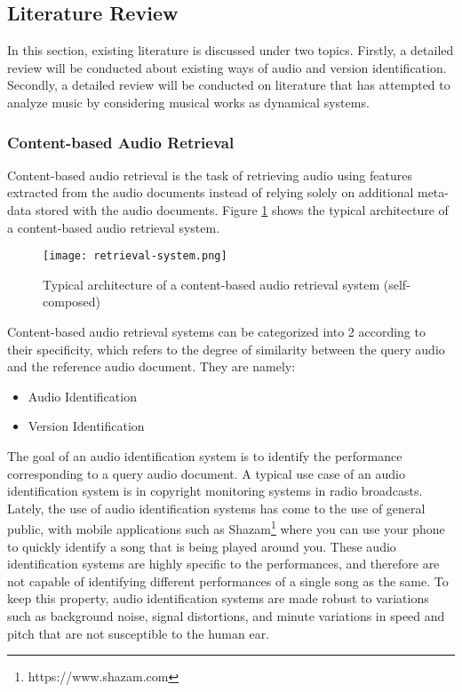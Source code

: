 \documentclass[../main.tex]{subfiles}
\begin{document}
\subsection{Literature Review}

In this section, existing literature is discussed under two topics. Firstly, a detailed review will be conducted about existing ways of audio and version identification. Secondly, a detailed review will be conducted on literature that has attempted to analyze music by considering musical works as dynamical systems. 

\subsubsection{Content-based Audio Retrieval}

\par
Content-based audio retrieval is the task of retrieving audio using features extracted from the audio documents instead of relying solely on additional meta-data stored with the audio documents. Figure \ref{fig:retrieval-system} shows the typical architecture of a content-based audio retrieval system.

\begin{figure}[H]
    \centering
    \texttt{[image: retrieval-system.png]}
    \caption{Typical architecture of a content-based audio retrieval system (self-composed)}
    \label{fig:retrieval-system}
\end{figure}

\par
Content-based audio retrieval systems can be categorized into 2 according to their specificity, which refers to the degree of similarity between the query audio and the reference audio document. They are namely:
\begin{itemize}
    \item Audio Identification
    \item Version Identification
\end{itemize}

\par
The goal of an audio identification system is to identify the performance corresponding to a query audio document. A typical use case of an audio identification system is in copyright monitoring systems in radio broadcasts. Lately, the use of audio identification systems has come to the use of general public, with mobile applications such as Shazam\footnote{https://www.shazam.com} where you can use your phone to quickly identify a song that is being played around you. These audio identification systems are highly specific to the performances, and therefore are not capable of identifying different performances of a single song as the same. To keep this property, audio identification systems are made robust to variations such as background noise, signal distortions, and minute variations in speed and pitch that are not susceptible to the human ear.
\end{document}
